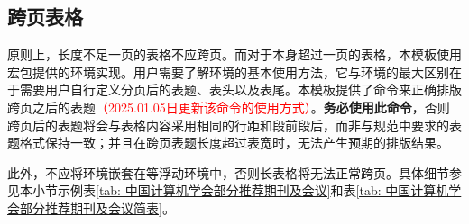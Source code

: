 \documentclass[print, doctor, vlined]{DissertUESTC}
\begin{document}
	
	\clearpage
	\subsection{跨页表格}
	
	原则上，长度不足一页的表格不应跨页。而对于本身超过一页的表格，本模板使用\href{https://mirrors.tuna.tsinghua.edu.cn/CTAN/macros/latex/required/tools/longtable.pdf}{}宏包提供的环境实现。用户需要了解环境的基本使用方法，它与环境的最大区别在于需要用户自行定义分页后的表题、表头以及表尾。本模板提供了命令来正确排版跨页之后的表题\textcolor{red}{（2025.01.05日更新该命令的使用方式）}。\textbf{务必使用此命令}，否则跨页后的表题将会与表格内容采用相同的行距和段前段后，而非与规范中要求的表题格式保持一致；并且在跨页表题长度超过表宽时，无法产生预期的排版结果。
	
	此外，不应将环境嵌套在等浮动环境中，否则长表格将无法正常跨页。具体细节参见本小节示例表\ref{tab: 中国计算机学会部分推荐期刊及会议}和表\ref{tab: 中国计算机学会部分推荐期刊及会议简表}。
	
\end{document}
